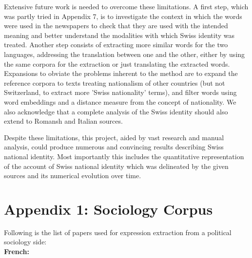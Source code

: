 \documentclass[11pt]{article}
\begin{document}
Extensive future work is needed to overcome these limitations. A first step, which was partly tried in Appendix 7, is to investigate the context in which the words were used in the newspapers to check that they are used with the intended meaning and better understand the modalities with which Swiss identity was treated. Another step consists of extracting more similar words for the two languages, addressing the translation between one and the other, either by using the same corpora for the extraction or just translating the extracted words. Expansions to obviate the problems inherent to the method are to expand the reference corpora to texts treating nationalism of other countries (but not Switzerland, to extract more 'Swiss nationality' terms), and filter words using word embeddings and a distance measure from the concept of nationality. We also acknowledge that a complete analysis of the Swiss identity should also extend to Romansh and Italian sources.\par
Despite these limitations, this project, aided by vast research and manual analysis, could produce numerous and convincing results describing Swiss national identity. Most importantly this includes the quantitative representation of the account of Swiss national identity which was delineated by the given sources and its numerical evolution over time.


\newpage




\newpage
\pagestyle{empty}
\section*{Appendix 1: Sociology Corpus}
Following is the list of papers used for expression extraction from a political sociology side:\\

\noindent\textbf{French:}
\end{document}
